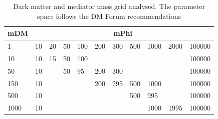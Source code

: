 \begin{table}[h]
\centering
\begin{tabular}{l|llllllllll}\hline
mDM  & \multicolumn{10}{c}{mPhi}                                   \\ \hline
1    & 10 & 20 & 50 & 100 & 200 & 300 & 500 & 1000 & 2000 & 100000 \\
10   & 10 & 15 & 50 & 100 &     &     &     &      &      & 100000 \\
50   & 10 &    & 50 & 95  & 200 & 300 &     &      &      & 100000 \\
150  & 10 &    &    &     & 200 & 295 & 500 & 1000 &      & 100000 \\
500  & 10 &    &    &     &     &     & 500 & 995  &      & 100000 \\
1000 & 10 &    &    &     &     &     &     & 1000 & 1995 & 100000\\ \hline
\end{tabular}
\caption{Dark matter and mediator mass grid analysed. The parameter space follows the DM Forum recommendations}
\label{tab:DMgrid}
\end{table}

